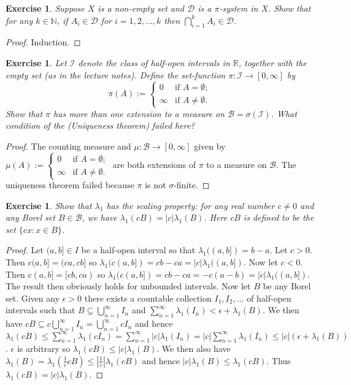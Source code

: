 \documentclass{article}
\newtheorem{exercise}[theorem]{Exercise}
\begin{document}
\begin{exercise}
    Suppose $X$ is a non-empty set and $\mathcal{D}$ is a $\pi$-system in $X$. Show that for any $k \in \mathbb{N}$, if $A_i \in \mathcal{D}$ for $i = 1, 2, \ldots, k$ then $\bigcap_{i=1}^{k} A_i \in \mathcal{D}$.
\end{exercise}
\begin{proof}
Induction.
\end{proof}
\begin{exercise}
    Let $\mathcal{I}$ denote the class of half-open intervals in $\mathbb{R}$, together with the empty set (as in the lecture notes). Define the set-function $\pi : \mathcal{I} \to [0, \infty]$ by
    \[
    \pi(A) :=
    \begin{cases}
        0 & \text{if } A = \emptyset; \\
        \infty & \text{if } A \neq \emptyset.
    \end{cases}
    \]
    Show that $\pi$ has more than one extension to a measure on $\mathcal{B} = \sigma(\mathcal{I})$. What condition of the (Uniqueness theorem) failed here?
\end{exercise}
\begin{proof}
The counting measure and $\mu:\mathcal{B}\to[0,\infty]$ given by $\mu(A) :=
    \begin{cases}
        0 & \text{if } A = \emptyset; \\
        \infty & \text{if } A \neq \emptyset.
    \end{cases}$ are both extensions of $\pi$ to a measure on $\mathcal{B}$. The uniqueness theorem failed because $\pi$ is not $\sigma$-finite.
\end{proof}
\begin{exercise}
Show that $\lambda_1$ has the scaling property: for any real number $c \neq 0$ and any Borel set $B \in \mathcal{B}$, we have $\lambda_1(cB) = |c| \lambda_1(B)$. Here $cB$ is defined to be the set $\{cx : x \in B\}$.
\end{exercise}
\begin{proof}
Let $(a,b]\in I$ be a half-open interval so that $\lambda_1((a,b])=b-a$. Let $c>0$. Then $c(a,b]=(ca,cb]$ so $\lambda_1(c(a,b])=cb-ca=|c|\lambda_1((a,b])$. Now let $c<0$. Then $c(a,b]=[cb,ca)$ so $\lambda_1(c(a,b])=cb-ca=-c(a-b)=|c|\lambda_1((a,b])$. The result then obviously holds for unbounded intervals. Now let $B$ be any Borel set. Given any $\epsilon>0$ there exists a countable collection $I_1,I_2,...$ of half-open intervals such that $B\subseteq\bigcup_{n=1}^\infty I_n$ and $\sum_{n=1}^\infty\lambda_1(I_n)<\epsilon+\lambda_1(B)$. We then have $cB\subseteq c\bigcup_{n=1}^\infty I_n=\bigcup_{n=1}^\infty cI_n$ and hence $\lambda_1(cB)\leq\sum_{n=1}^\infty\lambda_1(cI_n)=\sum_{n=1}^\infty|c|\lambda_1(I_n)=|c|\sum_{n=1}^\infty\lambda_1(I_n)\leq|c|(\epsilon+\lambda_1(B))$. $\epsilon$ is arbitrary so $\lambda_1(cB)\leq|c|\lambda_1(B)$. We then also have $\lambda_1(B)=\lambda_1(\frac{1}{c}cB)\leq|\frac{1}{c}|\lambda_1(cB)$ and hence $|c|\lambda_1(B)\leq\lambda_1(cB)$. Thus $\lambda_1(cB)=|c|\lambda_1(B)$.
\end{proof}
\end{document}
